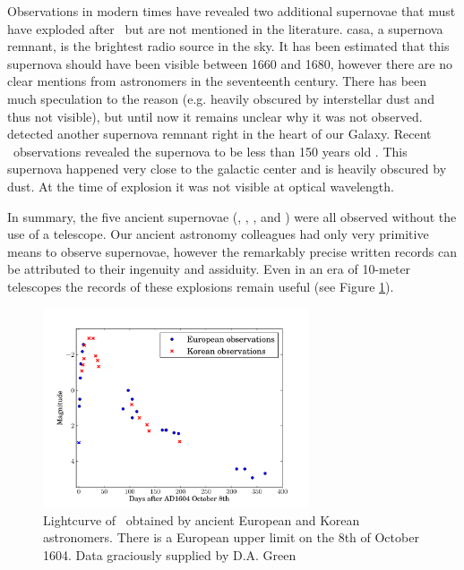 Observations in modern times have revealed two additional supernovae that must have exploded after \ but are not mentioned in the literature. \gls{casa}, a supernova remnant, is the brightest radio source in the sky. It has been estimated that this supernova should have been visible between 1660 and 1680, however there are no clear mentions from astronomers in the seventeenth century. There has been much speculation to the reason (e.g. heavily obscured by interstellar dust and thus not visible), but until now it remains unclear why it was not observed. \citet{1984Natur.312..527G} detected another supernova remnant right in the heart of our Galaxy. Recent \xray\ observations revealed the supernova to be less than 150 years old \citep{2008ApJ...680L..41R}. This supernova happened very close to the galactic center and is heavily obscured by dust. At the time of explosion it was not visible at optical wavelength. 

In summary, the five ancient supernovae (, , ,  and ) were all observed without the use of a telescope. Our ancient astronomy colleagues had only very primitive means to observe supernovae, however the remarkably precise written records can be attributed to their ingenuity and assiduity. Even in an era of 10-meter telescopes the records of these explosions remain useful (see Figure \ref{fig:sn1604_ancient_lc}).


\begin{figure}[htbp] %
   \centering
   \includegraphics[width=0.7\textwidth]{chapter_intro/plots/sn1604_ancient_lc.pdf} 
   \caption{Lightcurve of \ obtained by ancient European and Korean astronomers. There is a European upper limit on the 8th of October 1604. Data graciously supplied by D.A. Green \citep{1977QB841.C58......, 2003LNP...598....7G}}
   \label{fig:sn1604_ancient_lc}
\end{figure}

